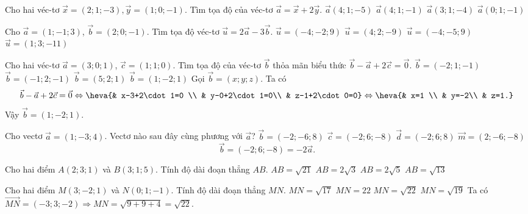 \begin{ex}
	Cho hai véc-tơ $\vec{x}=(2;1;-3),\vec{y}=(1;0;-1)$. Tìm tọa độ của véc-tơ $\vec{a}=\vec{x}+2\vec{y}$.
	\choice
	{\True $\vec{a}(4;1;-5)$}
	{$\vec{a}(4;1;-1)$}
	{$\vec{a}(3;1;-4)$}
	{$\vec{a}(0;1;-1)$}
\end{ex} 

\begin{ex}
	Cho $\vec{a}=(1;-1;3)$, $\vec{b}=(2;0;-1)$. Tìm tọa độ véc-tơ $\vec{u}=2\vec{a}-3\vec{b}$.
	\choice
	{\True $\vec{u}=(-4;-2;9)$}
	{$\vec{u}=(4;2;-9)$}
	{$\vec{u}=(-4;-5;9)$}
	{$\vec{u}=(1;3;-11)$}
\end{ex} 

\begin{ex}
	Cho hai véc-tơ  $\vec{a}=(3;0;1)$,  $\vec{c}=(1;1;0)$. Tìm tọa độ của véc-tơ $\vec{b}$ thỏa mãn biểu thức  $\vec{b}-\vec{a}+2\vec{c}=\vec{0}$.
	\choice
	{$\vec{b}=(-2;1;-1)$}
	{$\vec{b}=(-1;2;-1)$}
	{$\vec{b}=(5;2;1)$}
	{\True $\vec{b}=(1;-2;1)$}
	\loigiai
	{Gọi $\vec{b}=\left(x; y; z\right)$. Ta có
		$$\vec{b}-\vec{a}+2\vec{c}=\vec{0}\Leftrightarrow\heva{& x-3+2\cdot 1=0 \\ & y-0+2\cdot 1=0\\ & z-1+2\cdot 0=0}\Leftrightarrow\heva{& x=1 \\ & y=-2\\ & z=1.}$$
		Vậy $\vec{b}=(1;-2;1)$.
	}
\end{ex} 

\begin{ex}
	Cho vectơ $\vec{a}=(1;-3;4)$. Vectơ  nào sau đây cùng phương với $\vec{a}$?
	\choice
	{$\vec{b}=(-2;-6;8)$}
	{\True $\vec{c}=(-2;6;-8)$}
	{$\vec{d}=(-2;6;8)$}
	{$\vec{m}=(2;-6;-8)$}
	\loigiai
	{
		$$\vec{b}=(-2;6;-8)=-2\vec{a}.$$
	}
\end{ex} 

\begin{ex}
	Cho hai điểm $A(2;3;1)$ và  $B(3;1;5)$. Tính độ dài đoạn thẳng $AB$.
	\choice
	{\True  $AB= \sqrt{21}$}
	{$AB= 2\sqrt{3}$}
	{$AB= 2\sqrt{5}$}
	{$AB= \sqrt{13}$}
\end{ex} 

\begin{ex}
	Cho hai điểm $M(3;-2;1)$ và $N(0;1;-1)$. Tính độ dài đoạn thẳng $MN$.
	\choice
	{$MN=\sqrt{17}$}
	{$MN=22$}
	{\True $MN=\sqrt{22}$}
	{$MN=\sqrt{19}$}
	\loigiai
	{
		Ta có $\vec{MN}=(-3;3;-2)\Rightarrow MN=\sqrt{9+9+4}=\sqrt{22}$.
	}
\end{ex} 

